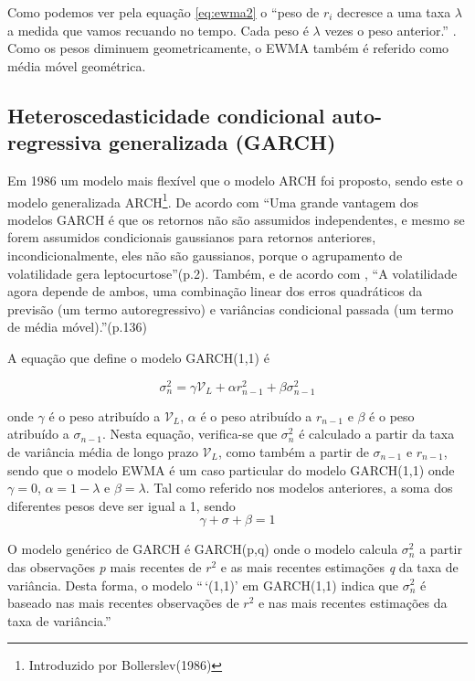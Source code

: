 \documentclass[
  12pt,
  a4paper,
  openany]{book}
\theoremstyle{definition}
\theoremstyle{definition}
\theoremstyle{definition}
\theoremstyle{remark}
\begin{document}
Como podemos ver pela equação \eqref{eq:ewma2} o ``peso de \(r_{i}\) decresce a uma taxa \(\lambda\) a medida que vamos recuando no tempo. Cada peso é \(\lambda\) vezes o peso anterior.'' \citep[p.226]{HullRisk2018}. Como os pesos diminuem geometricamente, o EWMA também é referido como média móvel geométrica.

\hypertarget{heteroscedasticidade-condicional-auto-regressiva-generalizada-garch}{%
\subsection{Heteroscedasticidade condicional auto-regressiva generalizada (GARCH)}\label{heteroscedasticidade-condicional-auto-regressiva-generalizada-garch}}

Em 1986 um modelo mais flexível que o modelo ARCH foi proposto, sendo este o modelo generalizada ARCH\footnote{Introduzido por Bollerslev(1986)}. De acordo com \citet{volatilitymodels} ``Uma grande vantagem dos modelos GARCH é que os retornos não são assumidos independentes, e mesmo se forem assumidos condicionais gaussianos para retornos anteriores, incondicionalmente, eles não são gaussianos, porque o agrupamento de volatilidade gera leptocurtose''(p.2). Também, e de acordo com \citet{portanalyse}, ``A volatilidade agora depende de ambos, uma combinação linear dos erros quadráticos da previsão (um termo autoregressivo) e variâncias condicional passada (um termo de média móvel).''(p.136)

A equação que define o modelo GARCH(1,1) é

\begin{equation} 
  \sigma_{n}^{2} = \gamma\mathcal{V}_{L} + \alpha r_{n-1}^{2} + \beta\sigma_{n-1}^{2}
  \label{eq:garch}
\end{equation}

onde \(\gamma\) é o peso atribuído a \(\mathcal{V}_{L}\), \(\alpha\) é o peso atribuído a \(r_{n-1}\) e \(\beta\) é o peso atribuído a \(\sigma_{n-1}\). Nesta equação, verifica-se que \(\sigma_{n}^{2}\) é calculado a partir da taxa de variância média de longo prazo \(\mathcal{V}_{L}\), como também a partir de \(\sigma_{n-1}\) e \(r_{n-1}\), sendo que o modelo EWMA é um caso particular do modelo GARCH(1,1) onde \(\gamma=0\), \(\alpha=1-\lambda\) e \(\beta=\lambda\). Tal como referido nos modelos anteriores, a soma dos diferentes pesos deve ser igual a 1, sendo \[\gamma+\sigma+\beta=1\]

O modelo genérico de GARCH é GARCH(p,q) onde o modelo calcula \(\sigma_{n}^{2}\) a partir das observações \emph{p} mais recentes de \(r^2\) e as mais recentes estimações \emph{q} da taxa de variância. Desta forma, o modelo ``\,`(1,1)' em GARCH(1,1) indica que \(\sigma_{n}^{2}\) é baseado nas mais recentes observações de \(r^2\) e nas mais recentes estimações da taxa de variância.''\citep[p.227]{Hull2018}
\end{document}
